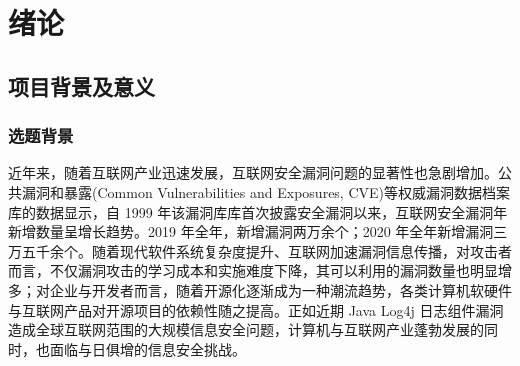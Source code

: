 \documentclass[a4paper,AutoFakeBold,oneside,12pt]{book}
\begin{document}
\blankmatter


\blankmatter


\blankmatter


\blankmatter


\frontmatter\tableofcontents %


\newpage\mainmatter
{}


\chapter{绪论}

\section{项目背景及意义}

\subsection{选题背景}

近年来，随着互联网产业迅速发展，互联网安全漏洞问题的显著性也急剧增加。公共漏洞和暴露(Common Vulnerabilities and Exposures, CVE)等权威漏洞数据档案库的数据显示\cite{download_cve_list}\cite{nvd_cpe_statistics}，自 1999 年该漏洞库库首次披露安全漏洞以来，互联网安全漏洞年新增数量呈增长趋势。2019 年全年，新增漏洞两万余个；2020 年全年新增漏洞三万五千余个。随着现代软件系统复杂度提升、互联网加速漏洞信息传播，对攻击者而言，不仅漏洞攻击的学习成本和实施难度下降，其可以利用的漏洞数量也明显增多\cite{vuldb_stats}；对企业与开发者而言，随着开源化逐渐成为一种潮流趋势，各类计算机软硬件与互联网产品对开源项目的依赖性随之提高。正如近期 Java Log4j 日志组件漏洞造成全球互联网范围的大规模信息安全问题，计算机与互联网产业蓬勃发展的同时，也面临与日俱增的信息安全挑战。
\end{document}
